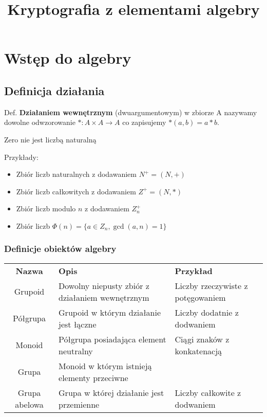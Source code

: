 \documentclass{report}
\title{Kryptografia z elementami algebry}
\begin{document}
\maketitle

\tableofcontents

\chapter{Wstęp do algebry} %

\section{Definicja działania}

Def.
\textbf{Działaniem wewnętrznym} (dwuargumentowym) w zbiorze A nazywamy dowolne odwzorowanie $* : A \times A \to A$ co zapisujemy $ *(a, b) = a * b $.

Zero nie jest liczbą naturalną

Przykłady:
\begin{itemize}
\item Zbiór liczb naturalnych z dodawaniem $N^+ = (N, +)$
\item Zbiór liczb całkowitych z dodawaniem $Z^+ = (N, *)$
\item Zbiór liczb modulo $n$ z dodawaniem $Z_n^+$
\item Zbiór liczb $\Phi(n) = \{ a \in Z_n, \gcd(a, n) = 1 \}$
\end{itemize}

\subsection{Definicje obiektów algebry}

\begin{center}
\begin{tabularx}{\textwidth}{ c X X }
	\toprule
	\textbf{Nazwa} & \textbf{Opis} & \textbf{Przykład}  \\
	Grupoid & Dowolny niepusty zbiór z działaniem wewnętrznym & Liczby rzeczywiste z potęgowaniem \\
	Półgrupa & Grupoid w którym działanie jest łączne & Liczby dodatnie z dodwaniem \\
	Monoid & Półgrupa posiadająca element neutralny & Ciągi znaków z konkatenacją \\
	Grupa &  Monoid w którym istnieją elementy przeciwne &  \\
	Grupa abelowa & Grupa w której działanie jest przemienne & Liczby całkowite z dodwaniem \\
	\bottomrule
\end{tabularx}
\end{center}
\end{document}

